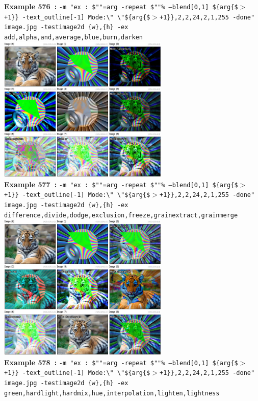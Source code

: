 \documentclass[a4paper,11pt,twoside]{book}
\begin{document}
\begin{center}
{\footnotesize \textbf{Example 576~:} \texttt{-m "ex : \$""=arg -repeat \$""\% --blend[0,1] \$\{arg\{\$$>$+1\}\} -text\_outline[-1] Mode:\textbackslash " \textbackslash "\$\{arg\{\$$>$+1\}\},2,2,24,2,1,255 -done" image.jpg -testimage2d \{w\},\{h\} -ex add,alpha,and,average,blue,burn,darken}}
\\\includegraphics[keepaspectratio=true,height=7cm,width=\textwidth]{img/gmic_def577.jpg}\\
{\footnotesize \textbf{Example 577~:} \texttt{-m "ex : \$""=arg -repeat \$""\% --blend[0,1] \$\{arg\{\$$>$+1\}\} -text\_outline[-1] Mode:\textbackslash " \textbackslash "\$\{arg\{\$$>$+1\}\},2,2,24,2,1,255 -done" image.jpg -testimage2d \{w\},\{h\} -ex difference,divide,dodge,exclusion,freeze,grainextract,grainmerge}}
\\\includegraphics[keepaspectratio=true,height=7cm,width=\textwidth]{img/gmic_def578.jpg}\\
{\footnotesize \textbf{Example 578~:} \texttt{-m "ex : \$""=arg -repeat \$""\% --blend[0,1] \$\{arg\{\$$>$+1\}\} -text\_outline[-1] Mode:\textbackslash " \textbackslash "\$\{arg\{\$$>$+1\}\},2,2,24,2,1,255 -done" image.jpg -testimage2d \{w\},\{h\} -ex green,hardlight,hardmix,hue,interpolation,lighten,lightness}}

\end{center}
\end{document}
